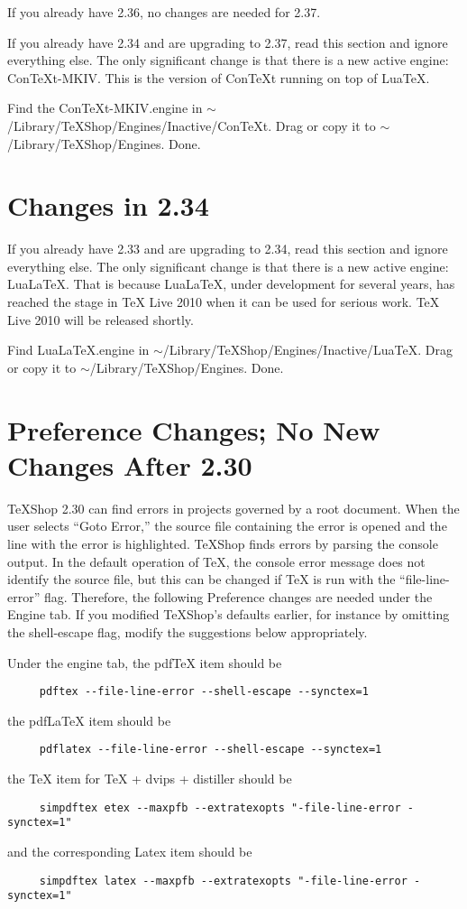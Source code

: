 \documentclass[11pt, oneside]{amsart}
\begin{document}
If you already have 2.36, no changes are needed for 2.37.

If you already have 2.34 and are upgrading to 2.37, read this section and ignore everything else. The only significant change is that there is a new active engine: ConTeXt-MKIV. This is the version of ConTeXt running on top of LuaTeX.

Find the ConTeXt-MKIV.engine in $\sim$/Library/TeXShop/Engines/Inactive/ConTeXt. Drag or copy it to $\sim$/Library/TeXShop/Engines. Done.


\section{Changes in 2.34}

If you already have 2.33 and are upgrading to 2.34, read this section and ignore everything else. The only significant change is that there is a new active engine: LuaLaTeX. That is because LuaLaTeX, under development for several years, has reached the stage in TeX Live 2010 when it can be used for serious work. TeX Live 2010 will be released shortly.

Find LuaLaTeX.engine in $\sim$/Library/TeXShop/Engines/Inactive/LuaTeX. Drag or copy it to $\sim$/Library/TeXShop/Engines. Done.

\section{Preference Changes;  No New Changes After 2.30}

TeXShop 2.30 can find errors in projects governed by a root document. When the user selects ``Goto Error,'' the source file containing the error is opened and the line with the error is highlighted. TeXShop finds errors by parsing the console output. In the default operation of TeX, the console error message does not identify the source file, but this can be changed if TeX is run with the ``file-line-error'' flag. Therefore, the following Preference changes are needed under the Engine tab. If you modified TeXShop's defaults earlier, for instance by omitting the shell-escape flag, modify the suggestions below appropriately.

Under the engine tab, the pdfTeX item should be
\begin{verbatim}
     pdftex --file-line-error --shell-escape --synctex=1
\end{verbatim}
the pdfLaTeX item should be
\begin{verbatim}
     pdflatex --file-line-error --shell-escape --synctex=1 
\end{verbatim}
the TeX item for TeX + dvips + distiller should be
\begin{verbatim}
     simpdftex etex --maxpfb --extratexopts "-file-line-error -synctex=1"
\end{verbatim}
and the corresponding Latex item should be
\begin{verbatim}
     simpdftex latex --maxpfb --extratexopts "-file-line-error -synctex=1"
\end{verbatim}
\end{document}

